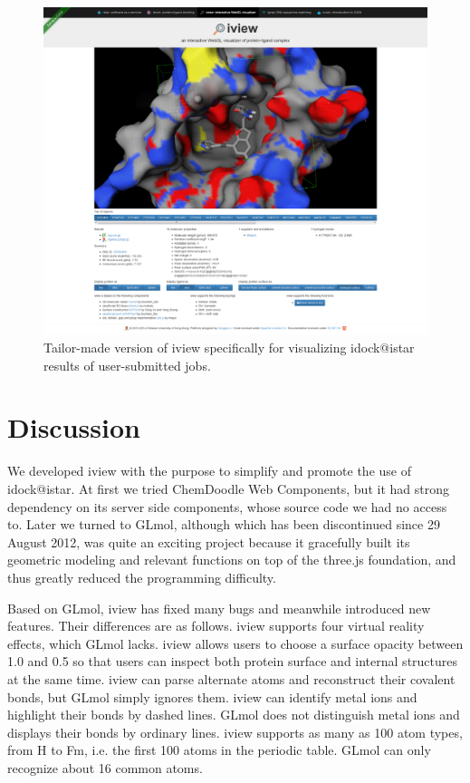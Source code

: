 \begin{figure}
\begin{center}
\includegraphics[width=\linewidth]{../iview/idock.png}
\end{center}
\caption{Tailor-made version of iview specifically for visualizing idock@istar results of user-submitted jobs.}
\label{iview:idock}
\end{figure}

\section{Discussion}

We developed iview with the purpose to simplify and promote the use of idock@istar. At first we tried ChemDoodle Web Components, but it had strong dependency on its server side components, whose source code we had no access to. Later we turned to GLmol, although which has been discontinued since 29 August 2012, was quite an exciting project because it gracefully built its geometric modeling and relevant functions on top of the three.js foundation, and thus greatly reduced the programming difficulty.

Based on GLmol, iview has fixed many bugs and meanwhile introduced new features. Their differences are as follows. iview supports four virtual reality effects, which GLmol lacks. iview allows users to choose a surface opacity between 1.0 and 0.5 so that users can inspect both protein surface and internal structures at the same time. iview can parse alternate atoms and reconstruct their covalent bonds, but GLmol simply ignores them. iview can identify metal ions and highlight their bonds by dashed lines. GLmol does not distinguish metal ions and displays their bonds by ordinary lines. iview supports as many as 100 atom types, from H to Fm, i.e. the first 100 atoms in the periodic table. GLmol can only recognize about 16 common atoms.

